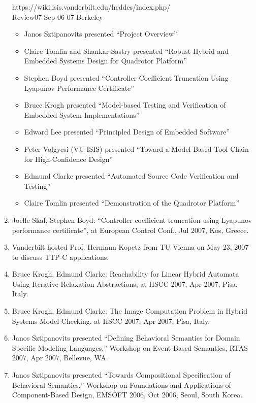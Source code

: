 \begin{enumerate}
https://wiki.isis.vanderbilt.edu/hcddes/index.php/ \\
\indent Review07-Sep-06-07-Berkeley

\begin{itemize}
\item Janos Sztipanovits presented ``Project Overview''
\item Claire Tomlin and Shankar Sastry presented ``Robust Hybrid and Embedded Systems Design for Quadrotor Platform''
\item Stephen Boyd presented ``Controller Coefficient Truncation Using Lyapunov Performance Certificate''
\item Bruce Krogh presented ``Model-based Testing and Verification of Embedded System Implementations''
\item Edward Lee presented ``Principled Design of Embedded Software''
\item Peter Volgyesi (VU ISIS) presented ``Toward a Model-Based Tool Chain for High-Confidence Design''
\item Edmund Clarke presented ``Automated Source Code Verification and Testing''
\item Claire Tomlin presented ``Demonstration of the Quadrotor Platform''
\end{itemize}

\item Joelle Skaf, Stephen Boyd: ``Controller coefficient truncation using Lyapunov performance certificate'', at European Control Conf., Jul 2007, Kos, Greece.
\item Vanderbilt hosted Prof. Hermann Kopetz from TU Vienna on May 23, 2007 to discuss TTP-C applications.
\item Bruce Krogh, Edmund Clarke: Reachability for Linear Hybrid Automata Using Iterative Relaxation Abstractions, at HSCC 2007, Apr 2007, Pisa, Italy.
\item Bruce Krogh, Edmund Clarke: The Image Computation Problem in Hybrid Systems Model Checking. at HSCC 2007, Apr 2007, Pisa, Italy.

\item Janos Sztipanovits presented ``Defining Behavioral Semantics for Domain Specific Modeling Languages,'' Workshop on Event-Based Semantics, RTAS 2007, Apr 2007, Bellevue, WA.
\item Janos Sztipanovits presented ``Towards Compositional Specification of Behavioral Semantics,'' Workshop on Foundations and Applications of Component-Based Design, EMSOFT 2006, Oct 2006, Seoul, South Korea.


\end{enumerate}
